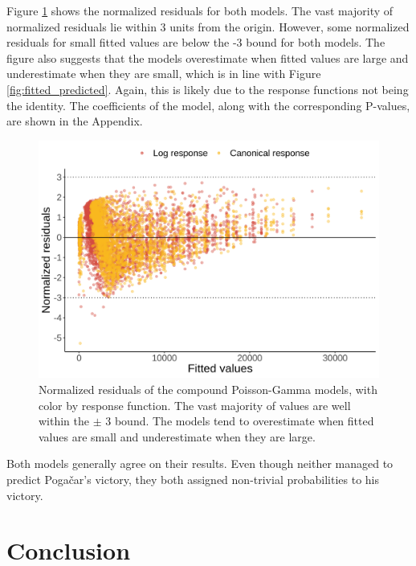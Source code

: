 \documentclass[aos,preprint]{imsart}
\begin{document}
Figure \ref{fig:norm_res} shows the normalized residuals for both models. The vast majority of normalized residuals lie within 3 units from the origin. However, some normalized residuals for small fitted values are below the -3 bound for both models. The figure also suggests that the models overestimate when fitted values are large and underestimate when they are small, which is in line with Figure \ref{fig:fitted_predicted}. Again, this is likely due to the response functions not being the identity. The coefficients of the  model, along with the corresponding P-values, are shown in the Appendix. \\




\begin{figure}[h]
  \centering
  \includegraphics[scale=0.65]{fig/norm_res_comparison.png}
  \caption{Normalized residuals of the compound Poisson-Gamma models, with color by response function. The vast majority of values are well within the $\pm$ 3 bound. The models tend to overestimate when fitted values are small and underestimate when they are large.}
  \label{fig:norm_res}
\end{figure}


Both models generally agree on their results. Even though neither managed to predict Pogačar's victory, they both assigned non-trivial probabilities to his victory.


\section{Conclusion} \label{sec:conclusion}
\end{document}
